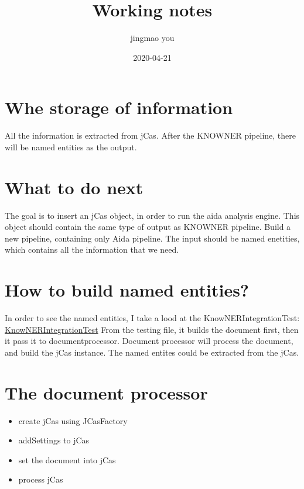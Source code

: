 \documentclass{article}
\title{Working notes}
\date{2020-04-21}
\author{jingmao you}
\begin{document}
 \maketitle
 \newpage

 \section{Whe storage of information }
All the information is extracted from jCas. 
\newline
After the KNOWNER pipeline, there will be named entities as the output. 

\section{What to do next}
The goal is to insert an jCas object, in order to run the aida analysis engine. 
\newline
This object should contain the same type of output as KNOWNER pipeline. 
\newline
Build a new pipeline, containing only Aida pipeline.
The input should be named enetities, which contains all the information that we need.

\section{How to build named entities?}
In order to see the named entities, I take a lood at the KnowNERIntegrationTest: \href{https://github.com/ambiverse-nlu/ambiverse-nlu/blob/341dc62abf47396aa04e6d0ca7c9e071b5d5b06e/src/main/java/de/mpg/mpi_inf/ambiversenlu/nlu/ner/KnowNERIntegrationTest.java}{KnowNERIntegrationTest}
\newline
From the testing file, it builds the document first, then it pass it to documentprocessor.
Document processor will process the document, and build the jCas instance.
The named entites could be extracted from the jCas.

\section{The document processor}
\begin{itemize}
	\item create jCas using JCasFactory
	\item addSettings to jCas
	\item set the document into jCas
    \item process jCas 
\end{itemize}
\end{document}
